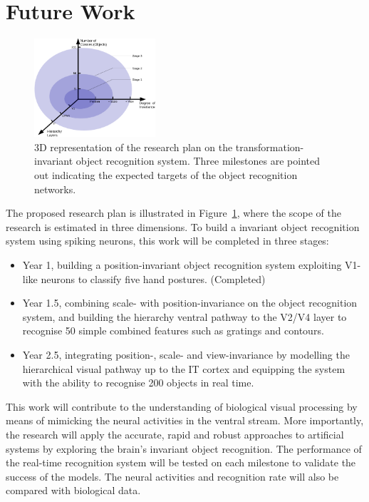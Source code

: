 \documentclass[journal]{journal}
\begin{document}
\section{Future Work} 
\begin{figure}[h!]
	\centering
	\includegraphics[width=0.4\textwidth]{pics/stages.png}
	\caption{3D representation of the research plan on the transformation-invariant object recognition system.
	Three milestones are pointed out indicating the expected targets of the object recognition networks.
	}
	\label{Fig:3Dplan}
\end{figure}
The proposed research plan is illustrated in Figure~\ref{Fig:3Dplan}, where the scope of the research is estimated in three dimensions.
To build a invariant object recognition system using spiking neurons, this work will be completed in three stages:
\begin{itemize}
	\item Year 1, building a position-invariant object recognition system exploiting V1-like neurons to classify five hand postures. (Completed)
	\item Year 1.5, combining scale- with position-invariance on the object recognition system, and building the hierarchy ventral pathway to the V2/V4 layer to recognise 50 simple combined features such as gratings and contours.
	\item Year 2.5, integrating position-, scale- and view-invariance by modelling the hierarchical visual pathway up to the IT cortex and equipping the system with the ability to recognise 200 objects in real time.
\end{itemize}
 
This work will contribute to the understanding of biological visual processing by means of mimicking the neural activities in the ventral stream.
More importantly, the research will apply the accurate, rapid and robust approaches to artificial systems by exploring the brain's invariant object recognition.
The performance of the real-time recognition system will be tested on each milestone to validate the success of the models.
The neural activities and recognition rate will also be compared with biological data.
\end{document}
